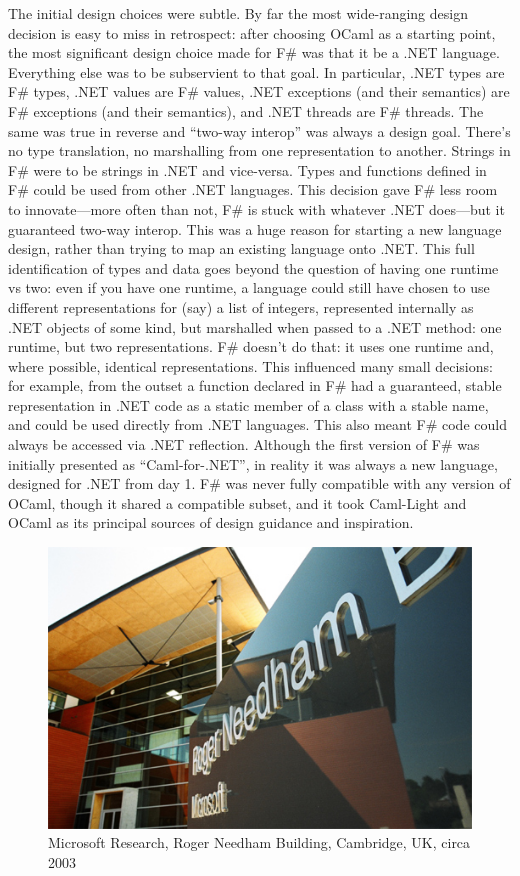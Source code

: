 \documentclass[acmsmall]{acmart}\settopmatter{}
\begin{document}
The initial design choices were subtle.  By far the most wide-ranging design decision is easy to miss in retrospect: after choosing OCaml as a starting point, the most significant design choice made for F\# was that it be a .NET language.  Everything else was to be subservient to that goal.  In particular, .NET types are F\# types, .NET values are F\# values, .NET exceptions (and their semantics) are F\# exceptions (and their semantics), and .NET threads are F\# threads.  The same was true in reverse and “two-way interop” was always a design goal.  There’s no type translation, no marshalling from one representation to another. Strings in F\# were to be strings in .NET and vice-versa.  Types and functions defined in F\# could be used from other .NET languages. This decision gave F\# less room to innovate---more often than not, F\# is stuck with whatever .NET does---but it guaranteed two-way interop.  This was a huge reason for starting a new language design, rather than trying to map an existing language onto .NET.  This full identification of types and data goes beyond the question of having one runtime vs two: even if you have one runtime, a language could still have chosen to use different representations for (say) a list of integers, represented internally as .NET objects of some kind, but marshalled when passed to a .NET method: one runtime, but two representations. F\# doesn’t do that: it uses one runtime and, where possible, identical representations. This influenced many small decisions: for example, from the outset a function declared in F\# had a guaranteed, stable representation in .NET code as a static member of a class with a stable name, and could be used directly from .NET languages.  This also meant F\# code could always be accessed via .NET reflection.  Although the first version of F\# was initially presented as “Caml-for-.NET”, in reality it was always a new language, designed for .NET from day 1. F\# was never fully compatible with any version of OCaml, though it shared a compatible subset, and it took Caml-Light and OCaml as its principal sources of design guidance and inspiration.  

\begin{figure}

  \includegraphics[width=0.7\linewidth]{msft.jpg}
  \caption{Microsoft Research, Roger Needham Building, Cambridge, UK, circa 2003}
  \label{fig:msft}

\end{figure}
\end{document}
